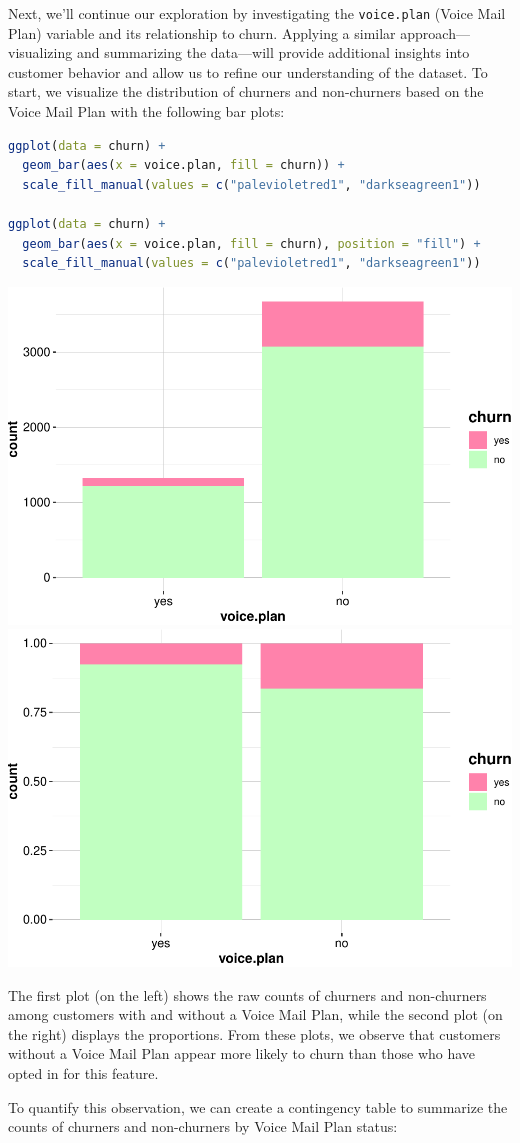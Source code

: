 \documentclass[
]{book}
\newcommand{\passthrough}[1]{#1}
\theoremstyle{definition}
\theoremstyle{definition}
\theoremstyle{definition}
\theoremstyle{definition}
\theoremstyle{remark}
\begin{document}
Next, we'll continue our exploration by investigating the \passthrough{\lstinline!voice.plan!} (Voice Mail Plan) variable and its relationship to churn. Applying a similar approach---visualizing and summarizing the data---will provide additional insights into customer behavior and allow us to refine our understanding of the dataset. To start, we visualize the distribution of churners and non-churners based on the Voice Mail Plan with the following bar plots:

\begin{lstlisting}[language=R]
ggplot(data = churn) + 
  geom_bar(aes(x = voice.plan, fill = churn)) +
  scale_fill_manual(values = c("palevioletred1", "darkseagreen1")) 

ggplot(data = churn) + 
  geom_bar(aes(x = voice.plan, fill = churn), position = "fill") +
  scale_fill_manual(values = c("palevioletred1", "darkseagreen1")) 
\end{lstlisting}

\includegraphics[width=0.5\linewidth]{EDA_files/figure-latex/unnamed-chunk-8-1} \includegraphics[width=0.5\linewidth]{EDA_files/figure-latex/unnamed-chunk-8-2}

The first plot (on the left) shows the raw counts of churners and non-churners among customers with and without a Voice Mail Plan, while the second plot (on the right) displays the proportions. From these plots, we observe that customers without a Voice Mail Plan appear more likely to churn than those who have opted in for this feature.

To quantify this observation, we can create a contingency table to summarize the counts of churners and non-churners by Voice Mail Plan status:
\end{document}
